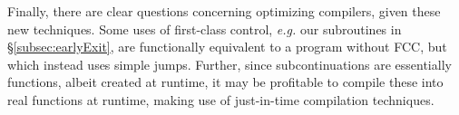 \documentclass[11pt]{article}
\newcommand{\maybePage}{\null}
\newcommand{\letin}[2]{\textsf{let }#1\textsf{ in }#2}
\newcommand\F{\mathcal{F}}
\newcommand{\angles}[1]{\langle#1\rangle}
\begin{document}
Finally, there are clear questions concerning optimizing compilers, given these new techniques.
Some uses of first-class control, \textit{e.g.} our subroutines in \S\ref{subsec:earlyExit}, are functionally equivalent to a program without FCC, but which instead uses simple jumps.
Further, since subcontinuations are essentially functions, albeit created at runtime, it may be profitable to compile these into real functions at runtime, making use of just-in-time compilation techniques.















%
%
%
%
%
%
%
%
%
\end{document}
